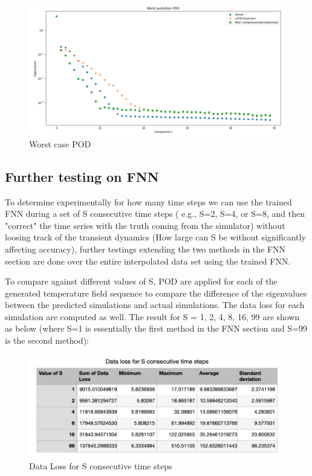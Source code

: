\begin{figure}[H]
    \caption{Worst case POD}
    \includegraphics[scale=0.5]{Report LaTeX/figures/mantle_convection_images/larger_dataset_interpolated/LSTM_Worst_POD.png}
\end{figure}


\subsection{Further testing on FNN}

To determine experimentally for how many time steps we can use the trained FNN during a set of S consecutive time steps ( e.g., S=2, S=4, or S=8, and then "correct" the time series with the truth coming from the simulator) without loosing track of the transient dynamics (How large can S be without significantly affecting accuracy), further testings extending the two methods in the FNN section are done over the entire interpolated data set using the trained FNN.

To compare against different values of S, POD are applied for each of the generated temperature field sequence to compare the difference of the eigenvalues between the predicted simulations and actual simulations. The data loss for each simulation are computed as well. The result for S = 1, 2, 4, 8, 16, 99 are shown as below (where S=1 is essentially the first method in the FNN section and S=99 is the second method):

\begin{figure}[H]
    \caption{Data Loss for S consecutive time steps}
    \includegraphics[scale=0.6]{Report LaTeX/figures/mantle_convection_images/further_testings/Data_Loss_table.png}
\end{figure}

